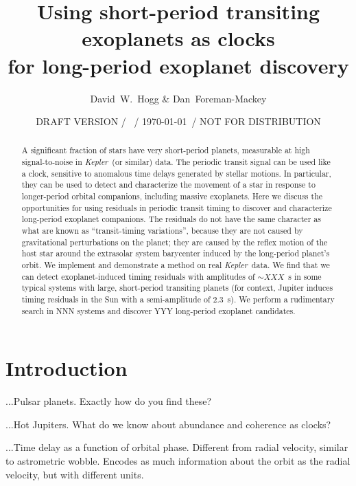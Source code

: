 \documentclass[12pt, preprint]{aastex}
\newcounter{affil}
\newcommand{\project}[1]{\textsl{#1}}
\newcommand{\Kepler}{\project{Kepler}}
\begin{document}
\title{
  Using short-period transiting exoplanets as clocks \\
  for long-period exoplanet discovery
}
\author{
  David~W.~Hogg\altaffilmark{\ref{ccpp},\ref{cds},\ref{mpia},\ref{email}}
  \&
  Dan~Foreman-Mackey\altaffilmark{\ref{ccpp}}
}
\date{DRAFT VERSION / \texttt{\githash}\ / \today\ / NOT FOR DISTRIBUTION}
\label{ccpp}
\label{cds}
\label{mpia}
\label{email}

\begin{abstract}
A significant fraction of stars have very short-period planets,
measurable at high signal-to-noise in \Kepler\ (or similar) data.
The periodic transit signal can be used like a clock, sensitive to
anomalous time delays generated by stellar motions.
In particular, they can be used to detect and characterize the
movement of a star in response to longer-period orbital companions,
including massive exoplanets.
Here we discuss the opportunities for using residuals in periodic
transit timing to discover and characterize long-period exoplanet
companions.
The residuals do not have the same character as what are known as
``transit-timing variations'', because they are not caused by
gravitational perturbations on the planet; they are caused by the
reflex motion of the host star around the extrasolar system barycenter
induced by the long-period planet's orbit.
We implement and demonstrate a method on real \Kepler\ data.  We find
that we can detect exoplanet-induced timing residuals with amplitudes
of $\sim XXX$~s in some typical systems with large, short-period
transiting planets (for context, Jupiter induces timing residuals in
the Sun with a semi-amplitude of 2.3~s).
We perform a rudimentary search in NNN systems and discover YYY
long-period exoplanet candidates.
\end{abstract}

\section{Introduction}

...Pulsar planets.  Exactly how do you find these?

...Hot Jupiters.  What do we know about abundance and coherence as
clocks?

...Time delay as a function of orbital phase.  Different from radial
velocity, similar to astrometric wobble.  Encodes as much information
about the orbit as the radial velocity, but with different units.
\end{document}
